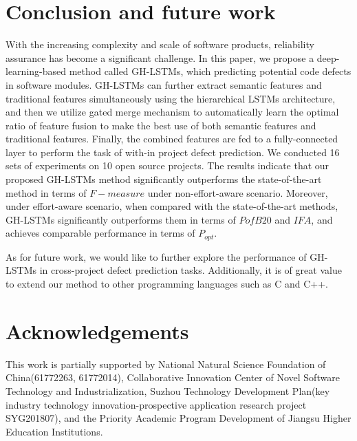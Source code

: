\documentclass[journal]{IEEEtran}
\begin{document}
\section{Conclusion and future work}
With the increasing complexity and scale of software products, reliability assurance has become a significant challenge. In this paper, we propose a deep-learning-based method called GH-LSTMs, which predicting potential code defects in software modules. GH-LSTMs can further extract semantic features and traditional features simultaneously using the hierarchical LSTMs architecture, and then we utilize gated merge mechanism to automatically learn the optimal ratio of feature fusion to make the best use of both semantic features and traditional features. Finally, the combined features are fed to a fully-connected layer to perform the task of with-in project defect prediction. We conducted 16 sets of experiments on 10 open source projects. The results indicate that our proposed GH-LSTMs method significantly outperforms the state-of-the-art method in terms of $F-measure$ under non-effort-aware scenario. Moreover, under effort-aware scenario, when compared with the state-of-the-art methods, GH-LSTMs significantly outperforms them in terms of $PofB20$ and $IFA$, and achieves comparable performance in terms of $P_{opt}$.

As for future work, we would like to further explore the performance of GH-LSTMs in cross-project defect prediction tasks. Additionally, it is of great value to extend our method to other programming languages such as C and C++.



\section*{Acknowledgements}

This work is partially supported by National Natural Science Foundation of China(61772263, 61772014), Collaborative Innovation Center of Novel Software Technology and Industrialization, Suzhou Technology Development Plan(key industry technology innovation-prospective application research project SYG201807), and the Priority Academic Program Development of Jiangsu Higher Education Institutions.


%




\clearpage
\end{document}
